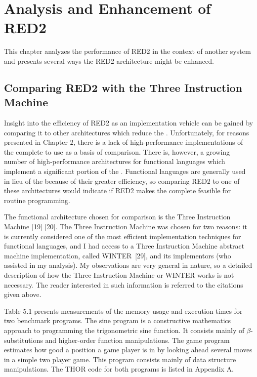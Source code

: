 \chapter{Analysis and Enhancement of RED2}

This chapter analyzes the performance of RED2 in the context of another
\lambdacalculus{} system and presents several ways the RED2 architecture might
be enhanced.

\section{Comparing RED2 with the Three Instruction Machine}

Insight into the efficiency of RED2 as an implementation vehicle can be gained
by comparing it to other architectures which reduce the \lambdacalculus{}.
Unfortunately, for reasons presented in Chapter 2, there is a lack of
high-performance implementations of the complete \lambdacalculus{} to use as a
basis of comparison. There is, however, a growing number of high-performance
architectures for functional languages which implement a significant portion of
the \lambdacalculus{}. Functional languages are generally used in lieu of the
\lambdacalculus{} because of their greater efficiency, so comparing RED2 to one
of these architectures would indicate if RED2 makes the complete
\lambdacalculus{} feasible for routine programming.

The functional architecture chosen for comparison is the Three Instruction
Machine [19] [20]. The Three Instruction Machine was chosen for two reasons: it
is currently considered one of the most efficient implementation techniques for
functional languages, and I had access to a Three Instruction Machine abstract
machine implementation, called WINTER~[29], and its implementors (who assisted
in my analysis). My observations are very general in nature, so a detailed
description of how the Three Instruction Machine or WINTER works is not
necessary. The reader interested in such information is referred to the
citations given above.

Table 5.1 presents measurements of the memory usage and execution times for two
benchmark programs. The sine program is a constructive mathematics approach to
programming the trigonometric sine function. It consists mainly of
\(\beta\)-substitutions and higher-order function manipulations. The game program
estimates how good a position a game player is in by looking ahead several
moves in a simple two player game. This program consists mainly of data
structure manipulations. The THOR code for both programs is listed in Appendix
A.

